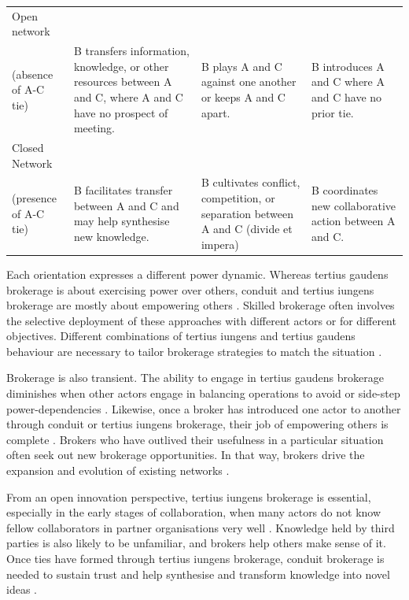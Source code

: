 \begin{table}
{\begin{threeparttable}
\begin{tabular*}{\textwidth}{>{\raggedright}p{5cm}>{\raggedright\arraybackslash}p{6cm}>{\raggedright\arraybackslash}p{6cm}>{\raggedright\arraybackslash}p{6cm}}
\midrule
Open network\\(absence of A-C tie) & B transfers information, knowledge, or other resources between A and C, where A and C have no prospect of meeting. & B plays A and C against one another or keeps A and C apart. & B introduces A and C where A and C have no prior tie. \\
\midrule
Closed Network\\(presence of A-C tie) & B facilitates transfer between A and C and may help synthesise new knowledge. & B cultivates conflict, competition, or separation between A and C (divide et impera) & B coordinates new collaborative action between A and C.  \\ 
\bottomrule
\end{tabular*}
\end{threeparttable}
}
\end{table}

Each orientation expresses a different power dynamic. Whereas tertius gaudens brokerage is about exercising power over others, conduit and tertius iungens brokerage are mostly about empowering others \citep{fleming2007collaborative,obstfeld2014brokerage}. Skilled brokerage often involves the selective deployment of these approaches with different actors or for different objectives. Different combinations of tertius iungens and tertius gaudens behaviour are necessary to tailor brokerage strategies to match the situation \citep{lingo2010nexus,obstfeld2014brokerage,quintane2016brokers}. \medskip

Brokerage is also transient. The ability to engage in tertius gaudens brokerage diminishes when other actors engage in balancing operations to avoid or side-step power-dependencies \citep{emerson1962power}. Likewise, once a broker has introduced one actor to another through conduit or tertius iungens brokerage, their job of empowering others is complete \citep{obstfeld2014brokerage}. Brokers who have outlived their usefulness in a particular situation often seek out new brokerage opportunities. In that way, brokers drive the expansion and evolution of existing networks \citep{obstfeld2014brokerage,quintane2016brokers}. \medskip

From an open innovation perspective, tertius iungens brokerage is essential, especially in the early stages of collaboration, when many actors do not know fellow collaborators in partner organisations very well \citep{fleming2007collaborative}. Knowledge held by third parties is also likely to be unfamiliar, and brokers help others make sense of it. Once ties have formed through tertius iungens brokerage, conduit brokerage is needed to sustain trust and help synthesise and transform knowledge into novel ideas \citep{quintane2016brokers}. \medskip 


